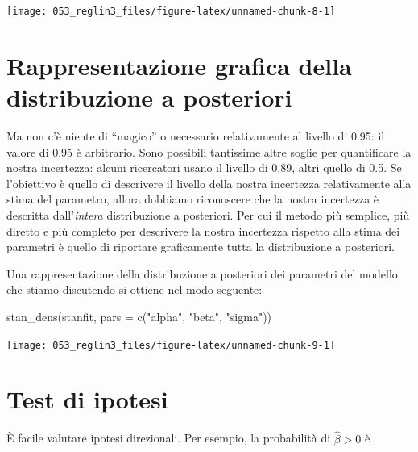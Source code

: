\documentclass[
]{memoir}
\newenvironment{Shaded}{\begin{snugshade}}{\end{snugshade}}
\newcommand{\AttributeTok}[1]{\textcolor[rgb]{0.77,0.63,0.00}{#1}}
\newcommand{\FunctionTok}[1]{\textcolor[rgb]{0.00,0.00,0.00}{#1}}
\newcommand{\NormalTok}[1]{#1}
\newcommand{\StringTok}[1]{\textcolor[rgb]{0.31,0.60,0.02}{#1}}
\begin{document}
\begin{center}\texttt{[image: 053\_reglin3\_files/figure-latex/unnamed-chunk-8-1]} \end{center}

\hypertarget{rappresentazione-grafica-della-distribuzione-a-posteriori}{%
\section{Rappresentazione grafica della distribuzione a posteriori}\label{rappresentazione-grafica-della-distribuzione-a-posteriori}}

Ma non c'è niente di ``magico'' o necessario relativamente al livello di 0.95: il valore di 0.95 è arbitrario. Sono possibili tantissime altre soglie per quantificare la nostra incertezza: alcuni ricercatori usano il livello di 0.89, altri quello di 0.5. Se l'obiettivo è quello di descrivere il livello della nostra incertezza relativamente alla stima del parametro, allora dobbiamo riconoscere che la nostra incertezza è descritta dall'\emph{intera} distribuzione a posteriori. Per cui il metodo più semplice, più diretto e più completo per descrivere la nostra incertezza rispetto alla stima dei parametri è quello di riportare graficamente tutta la distribuzione a posteriori.

Una rappresentazione della distribuzione a posteriori dei parametri del modello che stiamo discutendo si ottiene nel modo seguente:

\begin{Shaded}
\begin{Highlighting}[]
\FunctionTok{stan\_dens}\NormalTok{(stanfit, }\AttributeTok{pars =} \FunctionTok{c}\NormalTok{(}\StringTok{"alpha"}\NormalTok{, }\StringTok{"beta"}\NormalTok{, }\StringTok{"sigma"}\NormalTok{))}
\end{Highlighting}
\end{Shaded}

\begin{center}\texttt{[image: 053\_reglin3\_files/figure-latex/unnamed-chunk-9-1]} \end{center}

\hypertarget{test-di-ipotesi}{%
\section{Test di ipotesi}\label{test-di-ipotesi}}

È facile valutare ipotesi direzionali. Per esempio, la probabilità di \(\hat{\beta} > 0\) è
\end{document}
